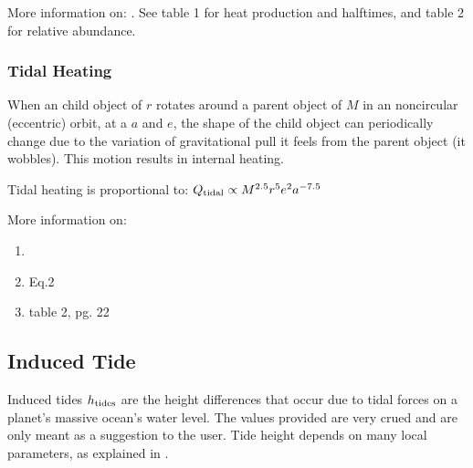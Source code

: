 \documentclass[letterpaper,10pt,english]{sphinxmanual}
\begin{document}
\sphinxAtStartPar
More information on:
.
See table 1 for heat production and half\sphinxhyphen{}times, and table 2 for relative abundance.


\subsubsection{Tidal Heating}
\label{\detokenize{quantities/surface/internal_heating/tidal_heating:tidal-heating}}\label{\detokenize{quantities/surface/internal_heating/tidal_heating::doc}}\label{\detokenize{quantities/surface/internal_heating/tidal_heating:id1}}
\sphinxAtStartPar
When an child object of {\hyperref[\detokenize{quantities/geometric/radius:id1}]{}} \(r\) rotates around a parent object
of {\hyperref[\detokenize{quantities/material/mass:id1}]{}} \(M\) in an non\sphinxhyphen{}circular (eccentric) orbit, at a
{\hyperref[\detokenize{quantities/orbital/semi_major_axis:id1}]{}} \(a\) and {\hyperref[\detokenize{quantities/orbital/eccentricity:id1}]{}} \(e\),
the shape of the child object can periodically change due to the variation of gravitational pull
it feels from the parent object (it wobbles). This motion results in internal heating.

\sphinxAtStartPar
Tidal heating is proportional to: \(Q_{\rm tidal} \propto M^{2.5} r^5 e^2 a^{-7.5}\)

\sphinxAtStartPar
More information on:
\begin{enumerate}
%
\item {} 
\sphinxAtStartPar
{}

\item {} 
\sphinxAtStartPar
{} Eq.2

\item {} 
\sphinxAtStartPar
{} table 2, pg. 22

\end{enumerate}


\subsection{Induced Tide}
\label{\detokenize{quantities/surface/induced_tide:induced-tide}}\label{\detokenize{quantities/surface/induced_tide::doc}}
\sphinxAtStartPar
Induced tides \(h_{\rm tides}\) are the height differences that occur due to tidal forces
on a planet’s massive ocean’s water level. The values provided are very
crued and are only meant as a suggestion to the user. Tide height depends
on many local parameters, as explained in .
\end{document}

